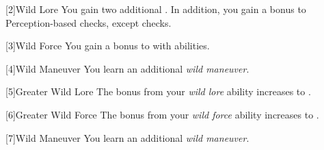         [2]{Wild Lore} You gain two additional .
        In addition, you gain a  bonus to Perception-based checks, except  checks.

        [3]{Wild Force} You gain a  bonus to  with  abilities.

        [4]{Wild Maneuver}
        You learn an additional \textit{wild maneuver}.

        [5]{Greater Wild Lore} The bonus from your \textit{wild lore} ability increases to .

        [6]{Greater Wild Force} The bonus from your \textit{wild force} ability increases to .

        [7]{Wild Maneuver}
        You learn an additional \textit{wild maneuver}.




\newpage
